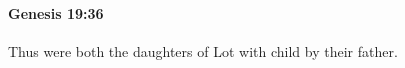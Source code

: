 
		\paragraph{Genesis 19:36} %
			\label{GENESIS-19-36}

			Thus were both the daughters of Lot with child by their father.


